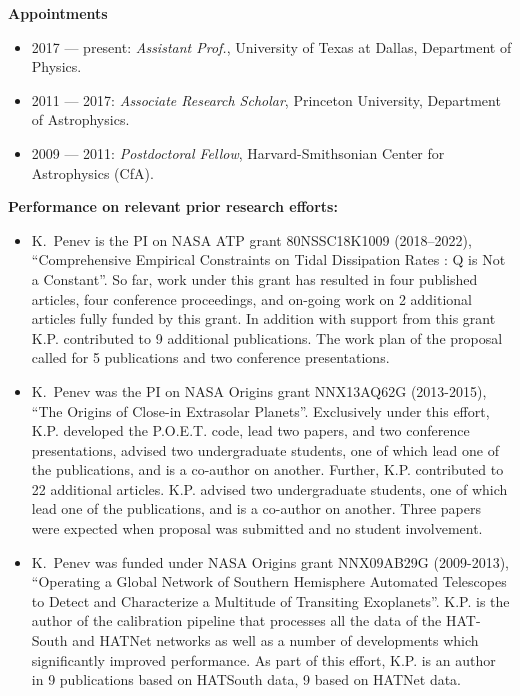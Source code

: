 %
\vspace{2mm}
%
{\bf \noindent Appointments\\}
%
\vspace{-5mm}
%
\begin{itemize}
%
\item 2017 --- present: {\em Assistant Prof.}, University of Texas at Dallas,
Department of Physics.
%
\item 2011 --- 2017: {\em Associate Research Scholar}, Princeton University,
Department of Astrophysics.
%
\item 2009 --- 2011: {\em Postdoctoral Fellow}, Harvard-Smithsonian
Center for Astrophysics (CfA).
\end{itemize}

\vspace{1mm}
%
{\bf \noindent Performance on relevant prior research efforts:\\}
%
\begin{itemize}
%
        \vspace{-5mm}
%
    \item K.~Penev is the PI on NASA ATP grant 80NSSC18K1009 (2018--2022),
        ``Comprehensive Empirical Constraints on Tidal Dissipation Rates : Q is
        Not a Constant''. So far, work under this grant has resulted in four
        published articles, four conference proceedings, and on-going work on 2
        additional articles fully funded by this grant. In addition with support
        from this grant K.P. contributed to 9 additional publications. The work
        plan of the proposal called for 5 publications and two conference
        presentations.
%
    \item K.~Penev was the PI on NASA Origins grant NNX13AQ62G (2013-2015),
        ``The Origins of Close-in Extrasolar Planets''. Exclusively under this
        effort, K.P. developed the P.O.E.T. code, lead two papers, and two
        conference presentations, advised two undergraduate students, one of
        which lead one of the publications, and is a co-author on another.
        Further, K.P. contributed to 22 additional articles. K.P.  advised two
        undergraduate students, one of which lead one of the publications, and
        is a co-author on another. Three papers were expected when proposal was
        submitted and no student involvement.
%
    \item K.~Penev was funded under NASA Origins grant NNX09AB29G (2009-2013),
        ``Operating a Global Network of Southern Hemisphere Automated Telescopes
        to Detect and Characterize a Multitude of Transiting Exoplanets''. K.P.
        is the author of the calibration pipeline that processes all the data of
        the HAT-South and HATNet networks as well as a number of developments
        which significantly improved performance. As part of this effort, K.P.
        is an author in 9 publications based on HATSouth data, 9 based on HATNet
        data.
%
\end{itemize}

